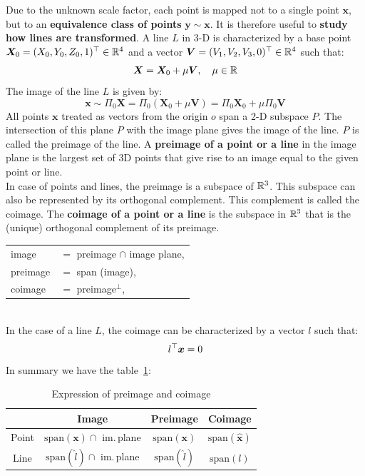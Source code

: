 Due to the unknown scale factor, each point is mapped not to a single
point $\bm{x}$, but to an \textbf{equivalence class of points} $\bm{ y \sim x}$.
It is therefore useful to \textbf{study how lines are transformed}.
A line $L$ in 3-D is characterized by a base point
$\bm{X}_0 = (X_0, Y_0, Z_0, 1)^{\top} \in \mathbb{R}^4$ and a vector
$\bm{V} = (V_1, V_2, V_3, 0)^{\top} \in \mathbb{R}^4$ such that:
\[
	\bm{X} = \bm{X}_0 + \mu \bm{V}, \quad \mu \in \mathbb{R}
\]
The image of the line $L$ is given by:
\[
	\bm{x} \sim \Pi_0 \bm{X}
	= \Pi_0 ( \bm{X}_0 + \mu \bm{V} )
	= \Pi_0 \bm{X}_0 + \mu \Pi_0 \bm{V}
\]
All points $\bm{x}$ treated as vectors from the origin $o$ span a 2-D
subspace $P$. The intersection of this plane $P$ with the image plane
gives the image of the line.
$P$ is called the preimage of the line.
A \textbf{preimage of a point or a line} in the image plane
is the largest set of 3D points that give rise to an image
equal to the given point or line.\\

In case of points and lines, the preimage is a subspace of $\mathbb{R}^3$.
This subspace can also be represented by its orthogonal complement.
This complement is called the coimage.
The \textbf{coimage of a point or a line} is the subspace in $\mathbb{R}^3$
that is the (unique) orthogonal complement of its preimage.\\

\begin{tabular}{ll}
	image &$=$ preimage $\cap$ image plane,\\
	preimage &$=$ span (image),\\
	coimage &$=$ preimage$^{\bot}$,\\
\end{tabular}\\[1em]

In the case of a line $L$, the coimage can be characterized by
a vector $l$ such that:
\[
	l^{\top} \bm{x} = 0
\]
In summary we have the table~\ref{tab:expression_preimage_coimage}:

\begin{table}[h]
\centering
\begin{tabular}{cccc}
	& Image & Preimage & Coimage \\ \midrule
	Point
		& $\text{span}(\bm{x}) \cap$ im.\,plane
		& $\text{span}(\bm{x})$
		& $\text{span}(\bm{\widehat{x}})$ \\
	Line
		& $\text{span}(\widehat{l}) \cap$ im.\,plane
		& $\text{span}(\widehat{l})$
		& $\text{span}(l)$ \\
\end{tabular}
\caption{Expression of preimage and coimage}%
\label{tab:expression_preimage_coimage}
\end{table}



